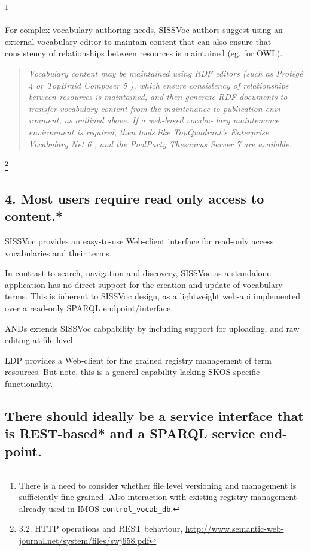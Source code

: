 \documentclass[10pt,a4paper]{article}
\newenvironment{italicquotes}
{\begin{quote}\itshape}
{\end{quote}}
\begin{document}
\begin{flushleft}
  \footnote {
    There is a need to consider whether file level versioning and management is
  sufficiently fine-grained. Also interaction with existing registry management
  already used in IMOS \texttt{control\_vocab\_db}. 
  }
  
  For complex vocabulary authoring needs, SISSVoc authors suggest using an
external vocabulary editor to maintain content that can also ensure that consistency of
relationships between resources is maintained (eg. for OWL). 

  \begin{italicquotes} 
  Vocabulary content may be maintained using RDF editors (such as Protégé 4 or
TopBraid Composer 5 ), which ensure consistency of
relationships between resources is maintained, and
then generate RDF documents to transfer vocabulary
content from the maintenance to publication envi-
ronment, as outlined above. If a web-based vocabu-
lary maintenance environment is required, then tools
like TopQuadrant’s Enterprise Vocabulary Net 6 , and
the PoolParty Thesaurus Server 7 are available.
  \end{italicquotes} 

  \footnote {
    3.2. HTTP operations and REST behaviour, 
\url{http://www.semantic-web-journal.net/system/files/swj658.pdf} 
  }


\subsection{ 
  4. Most users require read only access to content.* 
}
  SISSVoc provides an easy-to-use Web-client interface for read-only access vocabularies and their terms.

  In contrast to search, navigation and discovery, SISSVoc as a standalone application has no direct 
  support for the creation and update of vocabulary terms. This is inherent to SISSVoc design, as a 
  lightweight web-api implemented over a read-only SPARQL endpoint/interface.  

  ANDs extends SISSVoc cabpability by including support for uploading, and raw editing
  at file-level. 

  LDP provides a Web-client for fine grained registry management of term
resources. But note, this is a general capability lacking SKOS specific functionality.


\subsection{ 
  There should ideally be a service interface that is REST-based* and a SPARQL service end-point.
}


\end{flushleft}
\end{document}

